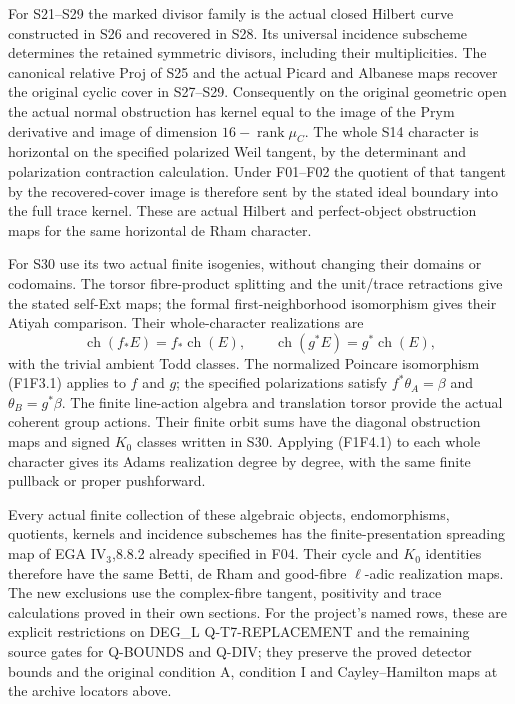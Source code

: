 For S21--S29 the marked divisor family is the actual closed
Hilbert curve constructed in S26 and recovered in S28.
Its universal incidence subscheme determines the retained
symmetric divisors, including their multiplicities. The canonical
relative Proj of S25 and the actual Picard and Albanese maps
recover the original cyclic cover in S27--S29. Consequently
on the original geometric open the actual normal obstruction
has kernel equal to the image of the Prym derivative and image
of dimension $16-\operatorname{rank}\mu_C$. The whole S14
character is horizontal on the specified polarized Weil
tangent, by the determinant and polarization contraction
calculation. Under F01--F02 the quotient of that tangent by
the recovered-cover image is therefore sent by the stated
ideal boundary into the full trace kernel. These are actual
Hilbert and perfect-object obstruction maps for the same
horizontal de Rham character.

For S30 use its two actual finite isogenies, without changing
their domains or codomains. The torsor fibre-product splitting
and the unit/trace retractions give the stated self-Ext maps;
the formal first-neighborhood isomorphism gives their Atiyah
comparison. Their whole-character realizations are
\[
 \operatorname{ch}(f_*E)=f_*\operatorname{ch}(E),
       \qquad
 \operatorname{ch}(g^*E)=g^*\operatorname{ch}(E),
\]
with the trivial ambient Todd classes. The normalized Poincare
isomorphism (F1F3.1) applies to $f$ and $g$; the specified
polarizations satisfy $f^*\theta_A=\beta$ and
$\theta_B=g^*\beta$. The finite line-action algebra and
translation torsor provide the actual coherent group actions.
Their finite orbit sums have the diagonal obstruction maps
and signed $K_0$ classes written in S30. Applying (F1F4.1)
to each whole character gives its Adams realization degree
by degree, with the same finite pullback or proper pushforward.

Every actual finite collection of these algebraic objects,
endomorphisms, quotients, kernels and incidence subschemes has
the finite-presentation spreading map of EGA IV$_3$,8.8.2
already specified in F04. Their cycle and $K_0$ identities
therefore have the same Betti, de Rham and good-fibre
$\ell$-adic realization maps. The new exclusions use the
complex-fibre tangent, positivity and trace calculations
proved in their own sections. For the project's named rows,
these are explicit restrictions on DEG\_L Q-T7-REPLACEMENT
and the remaining source gates for Q-BOUNDS and Q-DIV;
they preserve the proved detector bounds and the original
condition A, condition I and Cayley--Hamilton maps at the
archive locators above.


